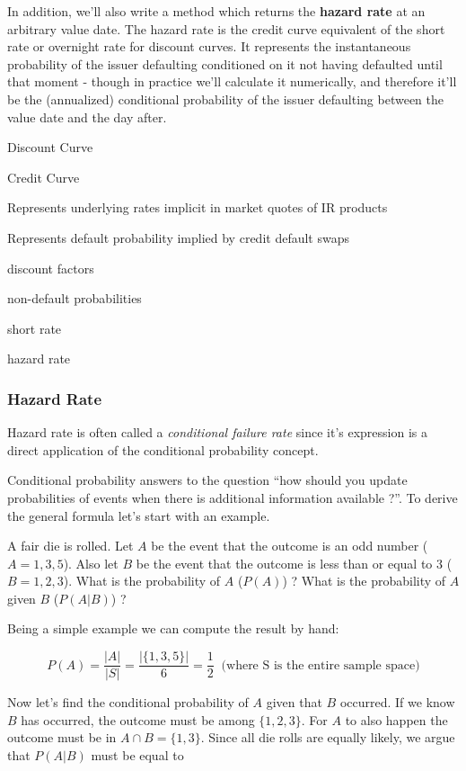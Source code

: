 \documentclass[11pt]{article}
\begin{document}
In addition, we'll also write a method which returns the \textbf{hazard
rate} at an arbitrary value date. The hazard rate is the credit curve
equivalent of the short rate or overnight rate for discount curves. It
represents the instantaneous probability of the issuer defaulting
conditioned on it not having defaulted until that moment - though in
practice we'll calculate it numerically, and therefore it'll be the
(annualized) conditional probability of the issuer defaulting between
the value date and the day after.

Discount Curve

Credit Curve

Represents underlying rates implicit in market quotes of IR products

Represents default probability implied by credit default swaps

discount factors

non-default probabilities

short rate

hazard rate

    \hypertarget{hazard-rate}{%
\subsubsection{Hazard Rate}\label{hazard-rate}}

Hazard rate is often called a \emph{conditional failure rate} since it's
expression is a direct application of the conditional probability
concept.

Conditional probability answers to the question ``how should you update
probabilities of events when there is additional information available
?''. To derive the general formula let's start with an example.

A fair die is rolled. Let \(A\) be the event that the outcome is an odd
number (\(A={1,3,5}\)). Also let \(B\) be the event that the outcome is
less than or equal to \(3\) (\(B={1,2,3}\)). What is the probability of
\(A\) (\(P(A)\)) ? What is the probability of \(A\) given \(B\)
(\(P(A|B)\)) ?

Being a simple example we can compute the result by hand:

\[P(A) = \frac{|A|}{|S|} = \frac{|\{1,3,5\}|}{6} = \frac{1}{2}\;\;\textrm{(where S is the entire sample space)}\]

Now let's find the conditional probability of \(A\) given that \(B\)
occurred. If we know \(B\) has occurred, the outcome must be among
\(\{1,2,3\}\). For \(A\) to also happen the outcome must be in
\(A\cap B = \{1,3\}\). Since all die rolls are equally likely, we argue
that \(P(A|B)\) must be equal to
\end{document}
